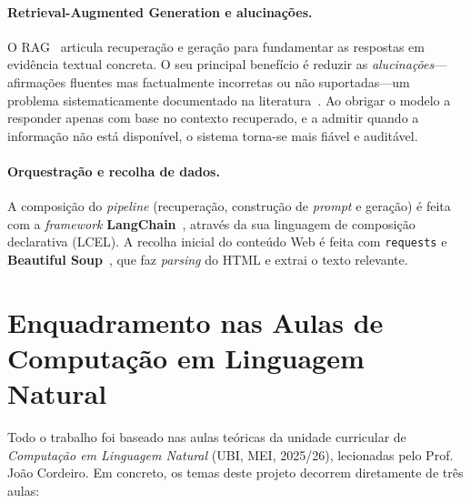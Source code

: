 \documentclass[]{ceurart}
\begin{document}
\paragraph{Retrieval-Augmented Generation e alucinações.}
O RAG~\cite{gao2024rag} articula recuperação e geração para fundamentar as
respostas em evidência textual concreta. O seu principal benefício é reduzir as
\emph{alucinações}---afirmações fluentes mas factualmente incorretas ou não
suportadas---um problema sistematicamente documentado na
literatura~\cite{ji2023hallucination}. Ao obrigar o modelo a responder apenas com
base no contexto recuperado, e a admitir quando a informação não está disponível,
o sistema torna-se mais fiável e auditável.

\paragraph{Orquestração e recolha de dados.}
A composição do \emph{pipeline} (recuperação, construção de \emph{prompt} e
geração) é feita com a \emph{framework} \textbf{LangChain}~\cite{langchain},
através da sua linguagem de composição declarativa (LCEL). A recolha inicial do
conteúdo Web é feita com \texttt{requests} e \textbf{Beautiful
Soup}~\cite{beautifulsoup}, que faz \emph{parsing} do HTML e extrai o texto
relevante.

\section{Enquadramento nas Aulas de Computação em Linguagem Natural}
\label{sec:aulas}

Todo o trabalho foi baseado nas aulas teóricas da unidade curricular de
\emph{Computação em Linguagem Natural} (UBI, MEI, 2025/26), lecionadas pelo
Prof. João Cordeiro. Em concreto, os temas deste projeto decorrem diretamente de
três aulas:
\end{document}
